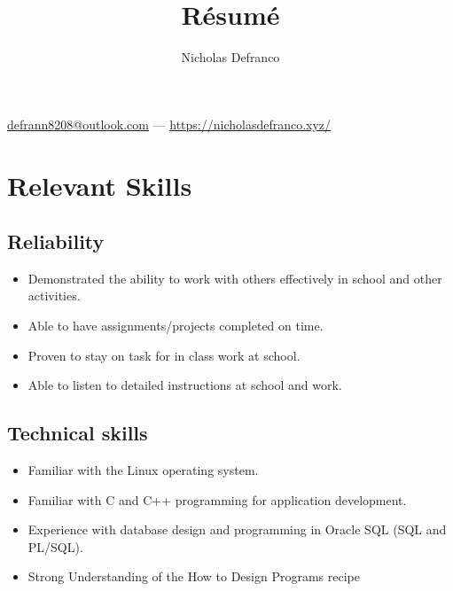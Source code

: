 \documentclass{article}
\makeatletter
\renewcommand{\maketitle}{
\begin{center}
{\Large\bfseries
\theauthor}

\vspace{0.75em}

\href{mailto://defrann8208@outlook.com}{defrann8208@outlook.com} ---
\url{https://nicholasdefranco.xyz/}

\vspace{0.25em}
%

\end{center}
}
\makeatother
\begin{document}
\title{R\'esum\'e}
\author{Nicholas Defranco}

\maketitle


\section{Relevant Skills}

\subsection{Reliability}

\begin{itemize}

\item Demonstrated the ability to work with others effectively in school and
	other activities.

\item Able to have assignments/projects completed on time.

\item Proven to stay on task for in class work at school.

\item Able to listen to detailed instructions at school and work.

\end{itemize}

\subsection{Technical skills}

\begin{itemize}

\item Familiar with the Linux operating system.

\item Familiar with C and C++ programming for application development.

\item Experience with database design and programming in Oracle SQL (SQL and
	PL/SQL).

\item Strong Understanding of the How to Design Programs recipe

\end{itemize}
\end{document}
